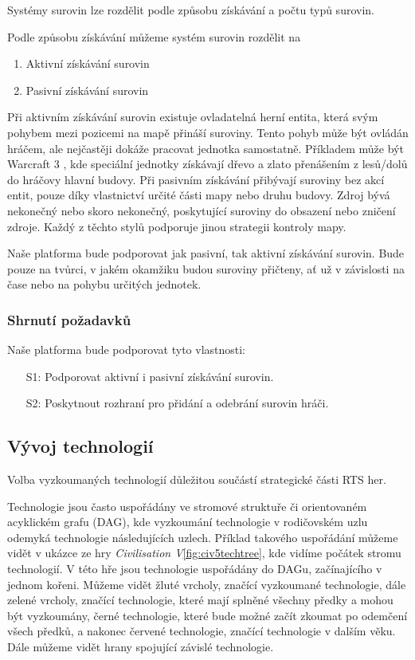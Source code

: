 Systémy surovin lze rozdělit podle způsobu získávání a počtu typů surovin.

Podle způsobu získávání můžeme systém surovin rozdělit na
\begin{enumerate}
	\item Aktivní získávání surovin
	\item Pasivní získávání surovin
\end{enumerate}

Při aktivním získávání surovin existuje ovladatelná herní entita, která svým pohybem mezi pozicemi na mapě přináší suroviny. Tento pohyb může být ovládán hráčem, ale nejčastěji dokáže pracovat jednotka samostatně. Příkladem může být Warcraft 3 \citep{site:warcraft3}, kde speciální jednotky získávají dřevo a zlato přenášením z lesů/dolů do hráčovy hlavní budovy. Při pasivním získávání přibývají suroviny bez akcí entit, pouze díky vlastnictví určité části mapy nebo druhu budovy. Zdroj bývá nekonečný nebo skoro nekonečný, poskytující suroviny do obsazení nebo zničení zdroje. Každý z těchto stylů podporuje jinou strategii kontroly mapy.

Naše platforma bude podporovat jak pasivní, tak aktivní získávání surovin. Bude pouze na tvůrci, v jakém okamžiku budou suroviny přičteny, ať už v závislosti na čase nebo na pohybu určitých jednotek. 

\subsubsection{Shrnutí požadavků}

Naše platforma bude podporovat tyto vlastnosti:
\begin{itemize}
	\item[S1:] Podporovat aktivní i pasivní získávání surovin.
	\item[S2:] Poskytnout rozhraní pro přidání a odebrání surovin hráči.
\end{itemize}

\subsection{Vývoj technologií}
\label{sec:vyzkum}
Volba vyzkoumaných technologií důležitou součástí strategické části RTS her. 

Technologie jsou často uspořádány ve stromové struktuře či orientovaném acyklickém grafu (DAG), kde vyzkoumání technologie v rodičovském uzlu odemyká technologie následujících uzlech. Příklad takového uspořádání můžeme vidět v ukázce ze hry \emph{Civilisation V}\citep{site:civ5}\ref{fig:civ5techtree}, kde vidíme počátek stromu technologií. V této hře jsou technologie uspořádány do DAGu, začínajícího v jednom kořeni. Můžeme vidět žluté vrcholy, značící vyzkoumané technologie, dále zelené vrcholy, značící technologie, které mají splněné všechny předky a mohou být vyzkoumány, černé technologie, které bude možné začít zkoumat po odemčení všech předků, a nakonec červené technologie, značící technologie v dalším věku. Dále můžeme vidět hrany spojující závislé technologie. 

